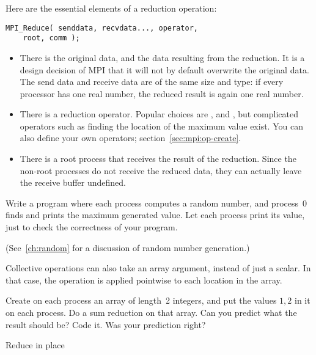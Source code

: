Here are the essential elements of a reduction operation:
\begin{lstlisting}
MPI_Reduce( senddata, recvdata..., operator,
    root, comm ); 
\end{lstlisting}
\begin{itemize}
\item There is the original data, and the data resulting from the
  reduction. It is a design decision of MPI that it will not by
  default overwrite the original data. The send data and receive data
  are of the same size and type: if every processor has one real
  number, the reduced result is again one real number.
\item There is a reduction operator. Popular choices are
  ,  and
  , but complicated operators such as finding
  the location of the maximum value exist. You can also define your
  own operators; section~\ref{sec:mpi:op-create}.
\item There is a root process that receives the result of the
  reduction. Since the non-root processes do not receive the reduced
  data, they can actually leave the receive buffer undefined.
\end{itemize}


\begin{exercise}
  \label{ex:randommax}
  Write a program where each process computes a random number, and process~0
  finds and prints the maximum generated value. Let each process print its value,
  just to check the correctness of your program.
\begin{book}
  (See~\ref{ch:random} for a discussion of random number generation.)
\end{book}
\end{exercise}

Collective operations can also take an array argument, instead of just a scalar.
In that case, the operation is applied pointwise to each location in the array.

\begin{exercise}
  \label{ex:randomcoord}
  Create on each process an array of length~2 integers, and put the
  values $1,2$ in it on each process. Do a sum reduction on that
  array. Can you predict what the result should be?  Code it. Was your
  prediction right?
\end{exercise}

 {Reduce in place}

